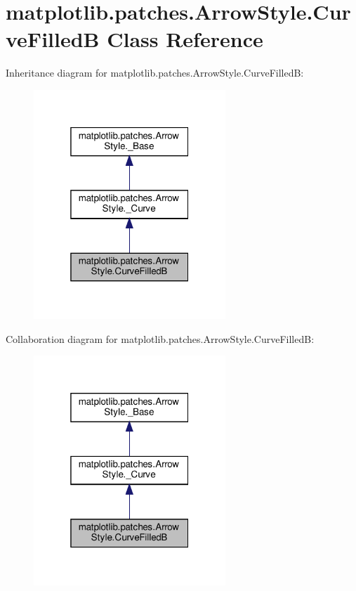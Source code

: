\hypertarget{classmatplotlib_1_1patches_1_1ArrowStyle_1_1CurveFilledB}{}\section{matplotlib.\+patches.\+Arrow\+Style.\+Curve\+FilledB Class Reference}
\label{classmatplotlib_1_1patches_1_1ArrowStyle_1_1CurveFilledB}


Inheritance diagram for matplotlib.\+patches.\+Arrow\+Style.\+Curve\+FilledB\+:
\nopagebreak
\begin{figure}[H]
\begin{center}
\leavevmode
\includegraphics[width=205pt]{classmatplotlib_1_1patches_1_1ArrowStyle_1_1CurveFilledB__inherit__graph}
\end{center}
\end{figure}


Collaboration diagram for matplotlib.\+patches.\+Arrow\+Style.\+Curve\+FilledB\+:
\nopagebreak
\begin{figure}[H]
\begin{center}
\leavevmode
\includegraphics[width=205pt]{classmatplotlib_1_1patches_1_1ArrowStyle_1_1CurveFilledB__coll__graph}
\end{center}
\end{figure}
